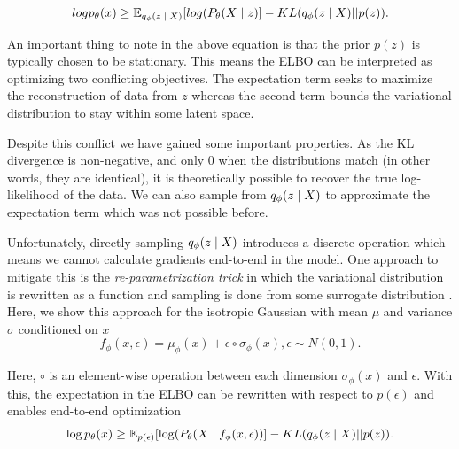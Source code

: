 \begin{equation}
	log p_{\theta}(x) \geq \operatorname{\mathbb{E}}_{q_{\phi}(z \; | \;{X})} [ log(P_{\theta}(X \; | \;{z}) ]  - KL(q_{\phi}(z \; | \;{X}) || p(z)).
\end{equation}

An important thing to note in the above equation is that the prior $p(z)$ is typically chosen to be stationary. This means the \ac{ELBO} can be interpreted as optimizing two conflicting objectives. The expectation term seeks to maximize the reconstruction of data from $z$ whereas the second term bounds the variational distribution to stay within some latent space.

Despite this conflict we have gained some important properties. As the KL divergence is non-negative, and only 0 when the distributions match (in other words, they are identical), it is theoretically possible to recover the true log-likelihood of the data. We can also sample from $q_{\phi}(z \; | \;{X})$ to approximate the expectation term which was not possible before.

Unfortunately, directly sampling $q_{\phi}(z \; | \;{X})$ introduces a discrete operation which means we cannot calculate gradients end-to-end in the model. One approach to mitigate this is the \textit{re-parametrization trick} in which the variational distribution  is rewritten as a function and sampling is done from some surrogate  distribution \cite{kingma2014autoencodingVB,rezende2014stochasticBackprop} . Here, we show this approach for the isotropic Gaussian with mean $\mu$ and variance $\sigma$ conditioned on $x$
\begin{equation}
f_{\phi}(x, \epsilon) = \mu_{\phi}(x) + \epsilon \circ \sigma_{\phi}(x), \epsilon \sim N(0, 1).
\end{equation}

Here, $\circ$ is an element-wise operation between each dimension $\sigma_{\phi}(x)$ and $\epsilon$. With this, the expectation in the \ac{ELBO} can be rewritten with respect to $p(\epsilon)$ and enables end-to-end optimization 
\begin{equation}
\log p_{\theta}(x) \geq \operatorname{\mathbb{E}}_{p(\epsilon) } [ \log(P_{\theta}(X \; | \;{f_{\phi}(x, \epsilon)}) ]  - KL(q_{\phi}(z \; | \;{X}) || p(z)).
\end{equation}






